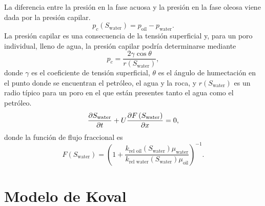 \documentclass[
  aspectratio=1610,
  c,
  handout,
  9pt,
  spanish
]{beamer}
\begin{document}
\begin{frame}
    \frametitle{\secname}

    La diferencia entre la presión en la fase acuosa y la presión en
    la fase oleosa viene dada por la presión capilar.
    \begin{equation}
        p_{c}\left(S_{\text{water}}\right)=
        p_{\text{oil}}-p_{\text{water}}.
    \end{equation}
    La presión capilar es una consecuencia de la tensión superficial
    y, para un poro individual, lleno de agua, la presión capilar
    podría determinarse mediante
    \begin{equation}
        p_{c}=
        \frac{2\gamma\cos\theta}{r\left(S_{\text{water}}\right)},
    \end{equation}
    donde $\gamma$ es el coeficiente de tensión superficial, $\theta$
    es el ángulo de humectación en el punto donde se encuentran el
    petróleo, el agua y la roca, y $r\left(S_{\text{water}}\right)$
    es un radio típico para un poro en el que están presentes tanto
    el agua como el petróleo.
    \begin{equation}
        \diffp{S_{\text{water}}}{t}+
        U\diffp{F\left(S_{\text{water}}\right)}{x}=0,
    \end{equation}
    donde la función de flujo fraccional es
    \begin{equation*}
        F\left(S_{\text{water}}\right)=
        {
        \left(
        1+
        \frac{
            k_{\text{rel oil}}\left(S_{\text{water}}\right)
            \mu_{\text{water}}
        }{
            k_{\text{rel water}}\left(S_{\text{water}}\right)
            \mu_{\text{oil}}
        }
        \right)}^{-1}.
    \end{equation*}
\end{frame}

\section{Modelo de Koval~\cite{booth2008a,Koval1963}}
\end{document}
